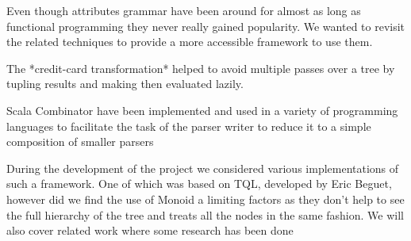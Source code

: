 Even though attributes grammar have been around for almost as long as functional programming they never really gained popularity. We wanted to revisit the related techniques to provide a more accessible framework to use them.

The *credit-card transformation* helped to avoid multiple passes over a tree by tupling results and making then evaluated lazily.

Scala Combinator have been implemented and used in a variety of programming languages to facilitate the task of the parser writer to reduce it to a simple composition of smaller parsers

During the development of the project we considered various implementations of such a framework. One of which was based on TQL, developed by Eric Beguet, however did we find the use of Monoid a limiting factors as they don't help to see the full hierarchy of the tree and treats all the nodes in the same fashion.
We will also cover related work where some research has been done 
